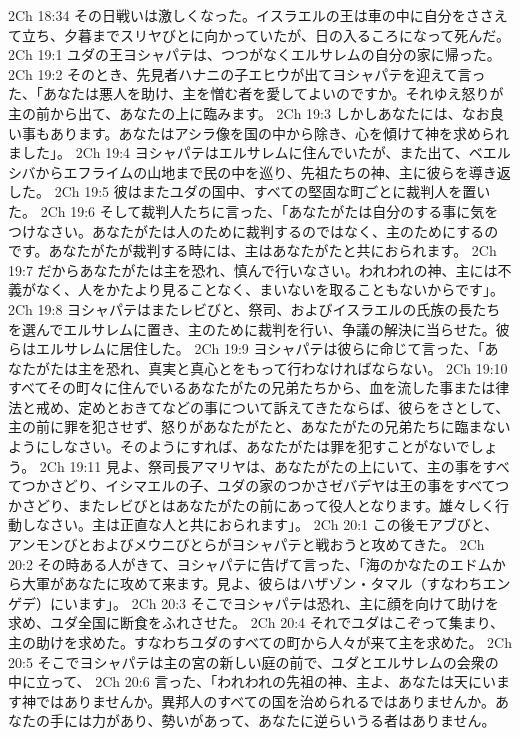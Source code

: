 2Ch 18:34  その日戦いは激しくなった。イスラエルの王は車の中に自分をささえて立ち、夕暮までスリヤびとに向かっていたが、日の入るころになって死んだ。
2Ch 19:1  ユダの王ヨシャパテは、つつがなくエルサレムの自分の家に帰った。
2Ch 19:2  そのとき、先見者ハナニの子エヒウが出てヨシャパテを迎えて言った、「あなたは悪人を助け、主を憎む者を愛してよいのですか。それゆえ怒りが主の前から出て、あなたの上に臨みます。
2Ch 19:3  しかしあなたには、なお良い事もあります。あなたはアシラ像を国の中から除き、心を傾けて神を求められました」。
2Ch 19:4  ヨシャパテはエルサレムに住んでいたが、また出て、ベエルシバからエフライムの山地まで民の中を巡り、先祖たちの神、主に彼らを導き返した。
2Ch 19:5  彼はまたユダの国中、すべての堅固な町ごとに裁判人を置いた。
2Ch 19:6  そして裁判人たちに言った、「あなたがたは自分のする事に気をつけなさい。あなたがたは人のために裁判するのではなく、主のためにするのです。あなたがたが裁判する時には、主はあなたがたと共におられます。
2Ch 19:7  だからあなたがたは主を恐れ、慎んで行いなさい。われわれの神、主には不義がなく、人をかたより見ることなく、まいないを取ることもないからです」。
2Ch 19:8  ヨシャパテはまたレビびと、祭司、およびイスラエルの氏族の長たちを選んでエルサレムに置き、主のために裁判を行い、争議の解決に当らせた。彼らはエルサレムに居住した。
2Ch 19:9  ヨシャパテは彼らに命じて言った、「あなたがたは主を恐れ、真実と真心とをもって行わなければならない。
2Ch 19:10  すべてその町々に住んでいるあなたがたの兄弟たちから、血を流した事または律法と戒め、定めとおきてなどの事について訴えてきたならば、彼らをさとして、主の前に罪を犯させず、怒りがあなたがたと、あなたがたの兄弟たちに臨まないようにしなさい。そのようにすれば、あなたがたは罪を犯すことがないでしょう。
2Ch 19:11  見よ、祭司長アマリヤは、あなたがたの上にいて、主の事をすべてつかさどり、イシマエルの子、ユダの家のつかさゼバデヤは王の事をすべてつかさどり、またレビびとはあなたがたの前にあって役人となります。雄々しく行動しなさい。主は正直な人と共におられます」。
2Ch 20:1  この後モアブびと、アンモンびとおよびメウニびとらがヨシャパテと戦おうと攻めてきた。
2Ch 20:2  その時ある人がきて、ヨシャパテに告げて言った、「海のかなたのエドムから大軍があなたに攻めて来ます。見よ、彼らはハザゾン・タマル（すなわちエンゲデ）にいます」。
2Ch 20:3  そこでヨシャパテは恐れ、主に顔を向けて助けを求め、ユダ全国に断食をふれさせた。
2Ch 20:4  それでユダはこぞって集まり、主の助けを求めた。すなわちユダのすべての町から人々が来て主を求めた。
2Ch 20:5  そこでヨシャパテは主の宮の新しい庭の前で、ユダとエルサレムの会衆の中に立って、
2Ch 20:6  言った、「われわれの先祖の神、主よ、あなたは天にいます神ではありませんか。異邦人のすべての国を治められるではありませんか。あなたの手には力があり、勢いがあって、あなたに逆らいうる者はありません。
